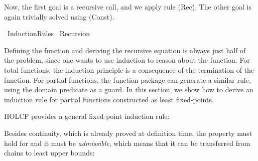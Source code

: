 \documentclass[copyright,creativecommons,sharealike]{eptcs}
\theoremstyle{remark}
\begin{document}
\begin{isabellebody}
\begin{isamarkuptxt}
  Now, the first goal is a recursive call, and we apply rule {\sc
  (Rec)}.
  The other goal is again trivially solved using {\sc (Const)}.\end{isamarkuptxt}\isamarkuptrue \endisatagproof
{\isafoldproof}\isadelimproof
\endisadelimproof
\isadelimtheory
\endisadelimtheory
\isatagtheory
\endisatagtheory
{\isafoldtheory}\isadelimtheory
\endisadelimtheory
\end{isabellebody} \begin{isabellebody}\def\isabellecontext{Induction{\isacharunderscore}Rules}\isadelimtheory
\endisadelimtheory
\isatagtheory
{}\isamarkupfalse \ Induction{\isacharunderscore}Rules\isanewline
{}\ Recursion\isanewline
{}\endisatagtheory
{\isafoldtheory}\isadelimtheory
\endisadelimtheory
{}
\isamarkuptrue \label{induction}
\isadelimproof
\endisadelimproof
\isatagproof
\endisatagproof
{\isafoldproof}\isadelimproof
\endisadelimproof
\isadelimproof
\endisadelimproof
\isatagproof
\endisatagproof
{\isafoldproof}\isadelimproof
\endisadelimproof
\isadelimproof
\endisadelimproof
\isatagproof
\endisatagproof
{\isafoldproof}\isadelimproof
\endisadelimproof
\begin{isamarkuptext}Defining the function and deriving the recursive equation is always
  just half of the problem, since one wants to use induction to
  reason about the function. For total functions, the induction principle
  is a consequence of the termination of the function.
  For partial functions, the function package can generate a similar
  rule, using the domain predicate as a guard.
  In this section, we show how to derive an induction rule for partial
  functions constructed as least fixed-points. 

  HOLCF provides a general fixed-point induction rule:
  \begin{quote}
  \end{quote}
  Besides continuity, which is already proved at definition time, the
  property  must hold for \isa{{\isasymbottom}} and it must be
  \emph{admissible}, which means that it can be transferred from
  chains to least upper bounds:
  \begin{quote}
  \end{quote}
  

\end{isamarkuptext}
\end{isabellebody}
\end{document}
